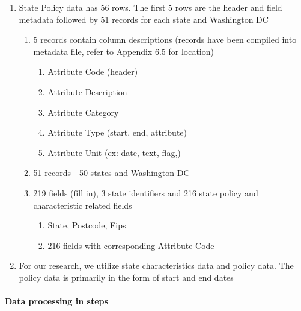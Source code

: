 \documentclass[
]{article}
\providecommand{\tightlist}{%
  \setlength{\itemsep}{0pt}\setlength{\parskip}{0pt}}
\begin{document}
\begin{enumerate}
\def\labelenumi{\arabic{enumi}.}
\tightlist
\item
  State Policy data has 56 rows. The first 5 rows are the header and
  field metadata followed by 51 records for each state and Washington DC

  \begin{enumerate}
  \def\labelenumii{\arabic{enumii}.}
  \tightlist
  \item
    5 records contain column descriptions (records have been compiled
    into metadata file, refer to Appendix 6.5 for location)

    \begin{enumerate}
    \def\labelenumiii{\alph{enumiii}.}
    \tightlist
    \item
      Attribute Code (header)
    \item
      Attribute Description
    \item
      Attribute Category
    \item
      Attribute Type (start, end, attribute)
    \item
      Attribute Unit (ex: date, text, flag,)
    \end{enumerate}
  \item
    51 records - 50 states and Washington DC
  \item
    219 fields (fill in), 3 state identifiers and 216 state policy and
    characteristic related fields

    \begin{enumerate}
    \def\labelenumiii{\alph{enumiii}.}
    \tightlist
    \item
      State, Postcode, Fips
    \item
      216 fields with corresponding Attribute Code
    \end{enumerate}
  \end{enumerate}
\item
  For our research, we utilize state characteristics data and policy
  data. The policy data is primarily in the form of start and end dates
\end{enumerate}

\hypertarget{data-processing-in-steps-3}{%
\paragraph{Data processing in steps}\label{data-processing-in-steps-3}}
\end{document}
